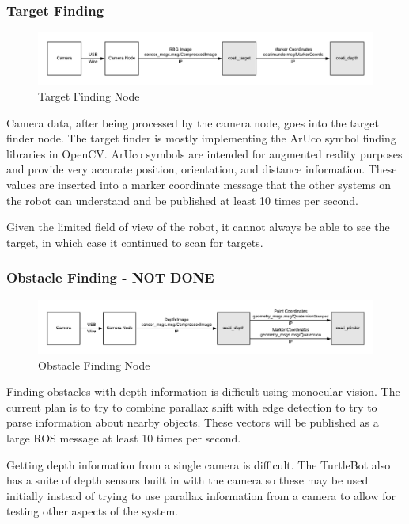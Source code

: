 \documentclass{article}
\begin{document}
	\subsubsection{Target Finding}
	
	\begin{figure}[H]
		\centering
		\includegraphics[width=0.9\linewidth]{TargetDiagram.png}
		\caption{Target Finding Node}
		\label{fig:target}
	\end{figure}

	Camera data, after being processed by the camera node, goes into the target finder node. The target finder is mostly implementing the ArUco symbol finding libraries in OpenCV. ArUco symbols are intended for augmented reality purposes and provide very accurate position, orientation, and distance information. These values are inserted into a marker coordinate message that the other systems on the robot can understand and be published at least 10 times per second.
	
	Given the limited field of view of the robot, it cannot always be able to see the target, in which case it continued to scan for targets.
	
	\subsubsection{Obstacle Finding - NOT DONE}
	
	\begin{figure}[H]
		\centering
		\includegraphics[width=0.9\linewidth]{DepthDiagram.png}
		\caption{Obstacle Finding Node}
		\label{fig:obstacle}
	\end{figure}

	Finding obstacles with depth information is difficult using monocular vision. The current plan is to try to combine parallax shift with edge detection to try to parse information about nearby objects. These vectors will be published as a large ROS message at least 10 times per second. 
	
	Getting depth information from a single camera is difficult. The TurtleBot also has a suite of depth sensors built in with the camera so these may be used initially instead of trying to use parallax information from a camera to allow for testing other aspects of the system.
    
\end{document}
